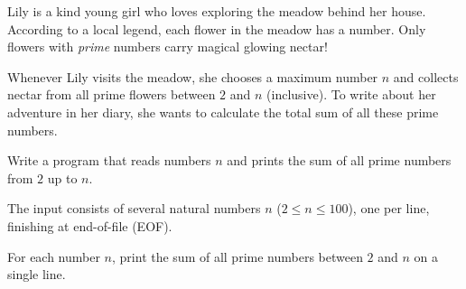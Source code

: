 
\Statement
Lily is a kind young girl who loves exploring the meadow behind her house. 
According to a local legend, each flower in the meadow has a number. Only flowers with \emph{prime} numbers carry magical glowing nectar!

Whenever Lily visits the meadow, she chooses a maximum number $n$ and collects nectar from all prime flowers between $2$ and $n$ (inclusive). To write about her adventure in her diary, she wants to calculate the total sum of all these prime numbers.

Write a program that reads numbers $n$ and prints the sum of all prime numbers from $2$ up to $n$.

\Input
The input consists of several natural numbers $n$ ($2 \le n \le 100$), one per line, finishing at end-of-file (EOF).

\Output
For each number $n$, print the sum of all prime numbers between $2$ and $n$ on a single line.

\Sample
